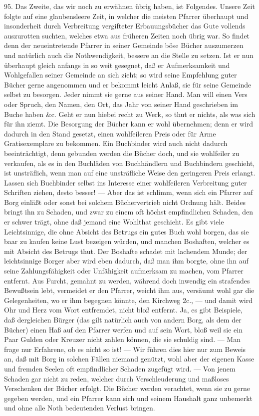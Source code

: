 95. Das Zweite, das wir noch zu erwähnen übrig haben, ist Folgendes. Unsere Zeit folgte auf eine glaubensleere Zeit, in welcher die meisten Pfarrer überhaupt und insonderheit durch Verbreitung vergifteter Erbauungsbücher das Gute vollends auszurotten suchten, welches etwa aus früheren Zeiten noch übrig war. So findet denn der neueintretende Pfarrer in seiner Gemeinde böse Bücher auszumerzen und natürlich auch die Nothwendigkeit, bessere an die Stelle zu setzen. Ist er nun überhaupt gleich anfangs in so weit gesegnet, daß er Aufmerksamkeit und Wohlgefallen seiner Gemeinde an sich zieht; so wird seine Empfehlung guter Bücher gerne angenommen und er bekommt
leicht Anlaß, sie für seine Gemeinde selbst zu besorgen. Jeder nimmt sie gerne aus seiner Hand. Man will einen Vers oder Spruch, den Namen, den Ort, das Jahr von seiner Hand geschrieben im Buche haben \&c. Geht er nun hiebei recht zu Werk, so thut er nichts, als was sich für ihn ziemt. Die Besorgung der Bücher kann er wohl übernehmen; denn er wird dadurch in den Stand gesetzt, einen wohlfeileren Preis oder für Arme Gratisexemplare zu bekommen. Ein Buchbinder wird auch nicht dadurch beeinträchtigt, denn gebunden werden die Bücher doch, und sie wohlfeiler zu verkaufen, als es in den Buchläden von Buchhändlern und Buchbindern geschieht, ist unsträflich, wenn man auf eine unsträfliche Weise den geringeren Preis erlangt. Lassen sich Buchbinder selbst ins Interesse einer wohlfeileren Verbreitung guter Schriften ziehen, desto besser! — Aber das ist schlimm, wenn sich ein Pfarrer auf Borg einläßt oder sonst bei solchem Büchervertrieb nicht Ordnung hält. Beides bringt ihn zu Schaden, und zwar zu einem oft höchst empfindlichen Schaden, den er schwer trägt, ohne daß jemand eine Wohlthat geschieht. Es gibt viele Leichtsinnige, die ohne Absicht des Betrugs ein gutes Buch wohl borgen, das sie baar zu kaufen keine Lust bezeigen würden, und manchen Boshaften, welcher es mit Absicht des Betrugs thut. Der Boshafte schadet mit lachendem Munde; der leichtsinnige Borger aber wird eben dadurch, daß man ihm borgte, ohne ihn auf seine Zahlungsfähigkeit oder Unfähigkeit aufmerksam zu machen, vom Pfarrer entfernt. Aus Furcht, gemahnt zu
werden, während doch inwendig ein strafendes Bewußtsein lebt, vermeidet er den Pfarrer, weicht ihm aus, versäumt wohl gar die Gelegenheiten, wo er ihm begegnen könnte, den Kirchweg 2c., — und damit wird Ohr und Herz vom Wort entfremdet, nicht bloß entfernt. Ja, es gibt Beispiele, daß dergleichen Bürger (das gilt natürlich auch von andern Borg, als dem der Bücher) einen Haß auf den Pfarrer werfen und auf sein Wort, bloß weil sie ein Paar Gulden oder Kreuzer nicht zahlen können, die sie schuldig sind. — Man frage nur Erfahrene, ob es nicht so ist! — Wir führen dies hier nur zum Beweis an, daß mit Borg in solchen Fällen niemand genützt, wohl aber der eigenen Kasse und fremden Seelen oft empfindlicher Schaden zugefügt wird. — Von jenem Schaden gar nicht zu reden, welcher durch Verschleuderung und maßloses Verschenken der Bücher erfolgt. Die Bücher werden verachtet, wenn sie zu gerne gegeben werden, und ein Pfarrer kann sich und seinem Haushalt ganz unbemerkt und ohne alle Noth bedeutenden Verlust bringen.

